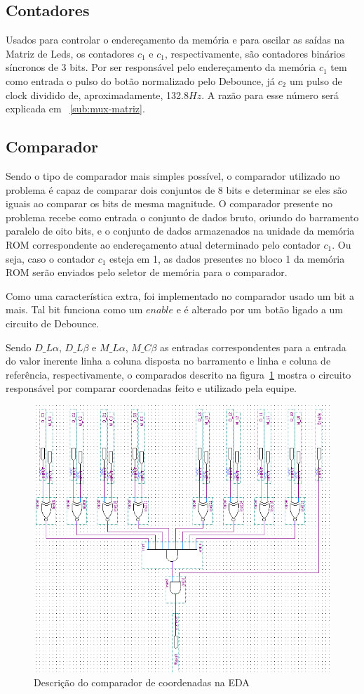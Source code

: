 \documentclass[12pt]{article}
\begin{document}
\subsection{Contadores}

Usados para controlar o endereçamento da memória e para oscilar as saídas na Matriz de Leds, os contadores $c_{1}$ e $c_{1}$, respectivamente, são contadores binários síncronos de 3 bits. Por ser responsável pelo endereçamento da memória $c_{1}$ tem como entrada o pulso do botão normalizado pelo Debounce, já $c_{2}$ um pulso de clock dividido de, aproximadamente, 132.8$Hz$. A razão para esse número será explicada em ~\ref{sub:mux-matriz}. 

\subsection{Comparador}
Sendo o tipo de comparador mais simples possível, o comparador utilizado no problema é capaz de comparar dois conjuntos de 8 bits e determinar se eles são iguais ao comparar os bits de mesma magnitude. O comparador presente no problema recebe como entrada o conjunto de dados bruto, oriundo do barramento paralelo de oito bits, e  o conjunto de dados armazenados na unidade da memória ROM correspondente ao endereçamento atual determinado pelo contador $c_{1}$. Ou seja, caso o contador $c_{1}$ esteja em 1, as dados presentes no bloco 1 da memória ROM serão enviados pelo seletor de memória para o comparador.

Como uma característica extra, foi implementado no comparador usado um bit a mais. Tal bit funciona como um $enable$ e é alterado por um botão ligado a um circuito de Debounce.

Sendo $D\_L\alpha$, $D\_L\beta$ e $M\_L\alpha$, $M\_C\beta$ as entradas correspondentes para a entrada do valor inerente linha a coluna disposta no barramento e linha e coluna de referência, respectivamente, o comparados descrito na figura~\ref{fig:comparador} mostra o circuito responsável por comparar coordenadas feito e utilizado pela equipe.

\begin{figure}[H]
\centering
\includegraphics[width=.8\textwidth]{img/comparador.png}
\caption{Descrição do comparador de coordenadas na EDA}
\label{fig:comparador}
\end{figure}
\end{document}
